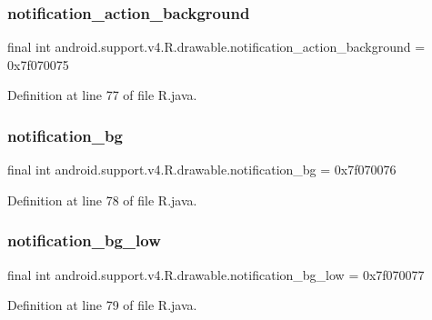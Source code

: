 \subsubsection{\texorpdfstring{notification\_action\_background}{notification\_action\_background}}
{\footnotesize\ttfamily final int android.\+support.\+v4.\+R.\+drawable.\+notification\+\_\+action\+\_\+background = 0x7f070075\hspace{0.3cm}{\ttfamily [static]}}



Definition at line 77 of file R.\+java.

\mbox{\label{classandroid_1_1support_1_1v4_1_1_r_1_1drawable_a0d0d6a26167a46b4f5473be51838a398}} 
\subsubsection{\texorpdfstring{notification\_bg}{notification\_bg}}
{\footnotesize\ttfamily final int android.\+support.\+v4.\+R.\+drawable.\+notification\+\_\+bg = 0x7f070076\hspace{0.3cm}{\ttfamily [static]}}



Definition at line 78 of file R.\+java.

\mbox{\label{classandroid_1_1support_1_1v4_1_1_r_1_1drawable_ab0f27bdda695d0483467980ff9046e64}} 
\subsubsection{\texorpdfstring{notification\_bg\_low}{notification\_bg\_low}}
{\footnotesize\ttfamily final int android.\+support.\+v4.\+R.\+drawable.\+notification\+\_\+bg\+\_\+low = 0x7f070077\hspace{0.3cm}{\ttfamily [static]}}



Definition at line 79 of file R.\+java.

